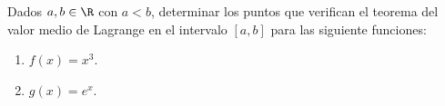 {Dados $a,b \in \R$ con $a<b$, determinar los puntos que verifican el teorema del valor medio de Lagrange en el intervalo $[a,b]$ para las siguiente funciones:
\begin{multicols}{2}
\begin{enumerate}
    \item  $f(x)=x^3$.

    \item  $g(x)=e^x$.
\end{enumerate}
\end{multicols}
}
